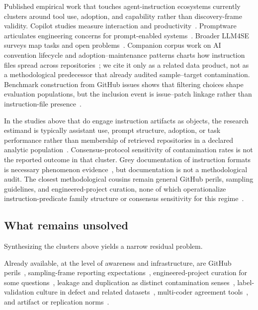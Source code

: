 Published empirical work that touches agent-instruction ecosystems currently clusters around tool use, adoption, and capability rather than discovery-frame validity.
Copilot studies measure interaction and productivity~\cite{ziegler2024copilot,barke2023groundedcopilot,vaithilingam2022expectation}.
Promptware articulates engineering concerns for prompt-enabled systems~\cite{chen2025promptware}.
Broader LLM4SE surveys map tasks and open problems~\cite{hou2024llm4se,fan2023}.
Companion corpus work on AI convention lifecycle and adoption--maintenance patterns charts how instruction files spread across repositories~\cite{ai_convention_lifecycle_corpus2026}; we cite it only as a related data product, not as a methodological predecessor that already audited sample--target contamination.
Benchmark construction from GitHub issues shows that filtering choices shape evaluation populations, but the inclusion event is issue--patch linkage rather than instruction-file presence~\cite{jimenez2024swebench}.

In the studies above that do engage instruction artifacts as objects, the research estimand is typically assistant use, prompt structure, adoption, or task performance rather than membership of retrieved repositories in a declared analytic population~\cite{ziegler2024copilot,chen2025promptware,ai_convention_lifecycle_corpus2026}.
Consensus-protocol sensitivity of contamination rates is not the reported outcome in that cluster.
Grey documentation of instruction formats is necessary phenomenon evidence~\cite{agentsmd2025,cursor2024docs,brown2024copilot,claude2024docs,anthropic2024mcp}, but documentation is not a methodological audit.
The closest methodological cousins remain general GitHub perils, sampling guidelines, and engineered-project curation, none of which operationalize instruction-predicate family structure or consensus sensitivity for this regime~\cite{kalliamvakou2015indepth,baltes2022sampling,munaiah2017curating,phantom2020}.

\subsection{What remains unsolved}
\label{subsec:rw-unsolved}

Synthesizing the clusters above yields a narrow residual problem.

Already available, at the level of awareness and infrastructure, are GitHub perils~\cite{kalliamvakou2015indepth,howison2004perils}, sampling-frame reporting expectations~\cite{baltes2022sampling}, engineered-project curation for some questions~\cite{munaiah2017curating,phantom2020}, leakage and duplication as distinct contamination senses~\cite{kaufman2012,lopes2017dejavu,allamanis2019duplication,kapoor2023leakage}, label-validation culture in defect and related datasets~\cite{herbold2022szz,shepperd2013nasa,shepperd2014bias}, multi-coder agreement tools~\cite{cohen1960kappa,landis1977kappa}, and artifact or replication norms~\cite{heumuller2020,winter2022artifacts,gonzalez2023revisit,liu2024researchartifacts,silva2012replication}.

